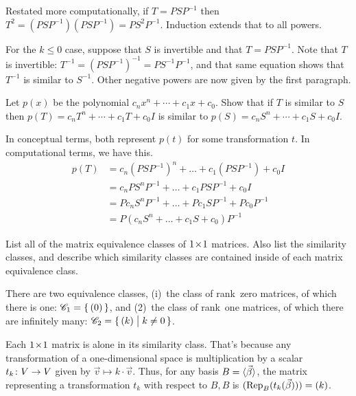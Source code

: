\begin{exercises}
\begin{answer}
      Restated more computationally, if \( T=PSP^{-1} \) then
      \( T^2=(PSP^{-1})(PSP^{-1})=PS^2P^{-1} \).
      Induction extends that to all powers.

      For the $k\leq 0$ case, 
      suppose that \( S \) is invertible and that \( T=PSP^{-1} \).
      Note that \( T \) is invertible:
      \( T^{-1}=(PSP^{-1})^{-1}=PS^{-1}P^{-1} \),
      and that same equation shows that 
      \( T^{-1} \) is similar to \( S^{-1} \).
      Other negative powers are now given by the first paragraph.  
    \end{answer}
  \recommended \item
    Let \( p(x) \) be the polynomial \( c_nx^n+\cdots+c_1x+c_0 \).
    Show that if \( T \) is similar to \( S \) then
    \( p(T)=c_nT^n+\cdots+c_1T+c_0I \) is similar to
    \( p(S)=c_nS^n+\cdots+c_1S+c_0I \).
    \begin{answer}
       In conceptual terms, both represent \( p(t) \) for some
       transformation \( t \).
       In computational terms, we have this.
       \begin{align*}
          p(T)
          &=c_n(PSP^{-1})^n+\dots+c_1(PSP^{-1})+c_0I   \\
          &=c_nPS^nP^{-1}+\dots+c_1PSP^{-1}+c_0I   \\
          &=Pc_nS^nP^{-1}+\dots+Pc_1SP^{-1}+Pc_0P^{-1}   \\
          &=P(c_nS^n+\dots+c_1S+c_0)P^{-1}
       \end{align*}  
     \end{answer}
  \item 
    List all of the matrix equivalence classes of \( \nbyn{1} \) matrices.
    Also list the similarity classes, and describe which similarity classes are
    contained inside of each matrix equivalence class.
    \begin{answer}
      There are two equivalence classes, (i)~the class of rank~zero matrices, 
      of which there is one:
      $\mathscr{C}_1=\set{(0)}$,
      and (2)~the class of rank~one matrices,
      of which there are infinitely many: 
      \( \mathscr{C}_2=\set{(k)\suchthat k\neq0} \).

      Each \( \nbyn{1} \) matrix is alone in its similarity class.
      That's because any transformation of a one-dimensional space
      is multiplication by a scalar $\map{t_k}{V}{V}$ given by
      $\vec{v}\mapsto k\cdot\vec{v}$. 
      Thus, for any basis \( B=\sequence{\vec{\beta}} \),
      the matrix representing a transformation \( t_k \) 
      with respect to \( B,B \) is
      \( (\rep{t_k(\vec{\beta})}{B})=(k) \). 
      

\end{answer}
\end{exercises}
